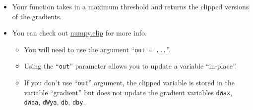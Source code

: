 \documentclass[11pt]{article}
\providecommand{\tightlist}{%
      \setlength{\itemsep}{0pt}\setlength{\parskip}{0pt}}
\begin{document}
\begin{itemize}
\tightlist
\item
  Your function takes in a maximum threshold and returns the clipped
  versions of the gradients.
\item
  You can check out
  \href{https://docs.scipy.org/doc/numpy-1.13.0/reference/generated/numpy.clip.html}{numpy.clip}
  for more info.

  \begin{itemize}
  \tightlist
  \item
    You will need to use the argument ``\texttt{out\ =\ ...}''.
  \item
    Using the ``\texttt{out}'' parameter allows you to update a variable
    ``in-place''.
  \item
    If you don't use ``\texttt{out}'' argument, the clipped variable is
    stored in the variable ``gradient'' but does not update the gradient
    variables \texttt{dWax}, \texttt{dWaa}, \texttt{dWya}, \texttt{db},
    \texttt{dby}.
  \end{itemize}
\end{itemize}
\end{document}
